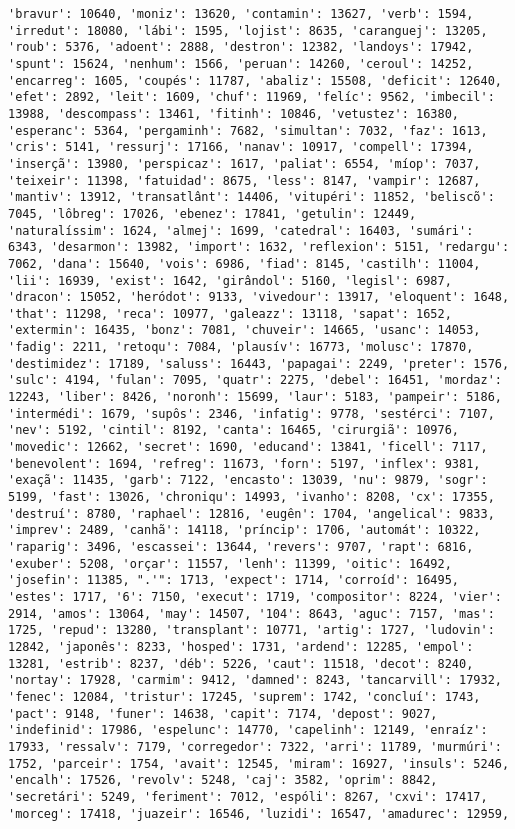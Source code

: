 \begin{Verbatim}[commandchars=\\\{\}]
'bravur': 10640, 'moniz': 13620, 'contamin': 13627, 'verb': 1594, 'irredut': 18080, 'lábi': 1595, 'lojist': 8635, 'caranguej': 13205, 'roub': 5376, 'adoent': 2888, 'destron': 12382, 'landoys': 17942, 'spunt': 15624, 'nenhum': 1566, 'peruan': 14260, 'ceroul': 14252, 'encarreg': 1605, 'coupés': 11787, 'abaliz': 15508, 'deficit': 12640, 'efet': 2892, 'leit': 1609, 'chuf': 11969, 'felíc': 9562, 'imbecil': 13988, 'descompass': 13461, 'fitinh': 10846, 'vetustez': 16380, 'esperanc': 5364, 'pergaminh': 7682, 'simultan': 7032, 'faz': 1613, 'cris': 5141, 'ressurj': 17166, 'nanav': 10917, 'compell': 17394, 'inserçã': 13980, 'perspicaz': 1617, 'paliat': 6554, 'míop': 7037, 'teixeir': 11398, 'fatuidad': 8675, 'less': 8147, 'vampir': 12687, 'mantiv': 13912, 'transatlânt': 14406, 'vitupéri': 11852, 'beliscõ': 7045, 'lôbreg': 17026, 'ebenez': 17841, 'getulin': 12449, 'naturalíssim': 1624, 'almej': 1699, 'catedral': 16403, 'sumári': 6343, 'desarmon': 13982, 'import': 1632, 'reflexion': 5151, 'redargu': 7062, 'dana': 15640, 'vois': 6986, 'fiad': 8145, 'castilh': 11004, 'lii': 16939, 'exist': 1642, 'girândol': 5160, 'legisl': 6987, 'dracon': 15052, 'heródot': 9133, 'vivedour': 13917, 'eloquent': 1648, 'that': 11298, 'reca': 10977, 'galeazz': 13118, 'sapat': 1652, 'extermin': 16435, 'bonz': 7081, 'chuveir': 14665, 'usanc': 14053, 'fadig': 2211, 'retoqu': 7084, 'plausív': 16773, 'molusc': 17870, 'destimidez': 17189, 'saluss': 16443, 'papagai': 2249, 'preter': 1576, 'sulc': 4194, 'fulan': 7095, 'quatr': 2275, 'debel': 16451, 'mordaz': 12243, 'liber': 8426, 'noronh': 15699, 'laur': 5183, 'pampeir': 5186, 'intermédi': 1679, 'supôs': 2346, 'infatig': 9778, 'sestérci': 7107, 'nev': 5192, 'cintil': 8192, 'canta': 16465, 'cirurgiã': 10976, 'movedic': 12662, 'secret': 1690, 'educand': 13841, 'ficell': 7117, 'benevolent': 1694, 'refreg': 11673, 'forn': 5197, 'inflex': 9381, 'exaçã': 11435, 'garb': 7122, 'encasto': 13039, 'nu': 9879, 'sogr': 5199, 'fast': 13026, 'chroniqu': 14993, 'ivanho': 8208, 'cx': 17355, 'destruí': 8780, 'raphael': 12816, 'eugên': 1704, 'angelical': 9833, 'imprev': 2489, 'canhã': 14118, 'príncip': 1706, 'automát': 10322, 'raparig': 3496, 'escassei': 13644, 'revers': 9707, 'rapt': 6816, 'exuber': 5208, 'orçar': 11557, 'lenh': 11399, 'oitic': 16492, 'josefin': 11385, ".'": 1713, 'expect': 1714, 'corroíd': 16495, 'estes': 1717, '6': 7150, 'execut': 1719, 'compositor': 8224, 'vier': 2914, 'amos': 13064, 'may': 14507, '104': 8643, 'aguc': 7157, 'mas': 1725, 'repud': 13280, 'transplant': 10771, 'artig': 1727, 'ludovin': 12842, 'japonês': 8233, 'hosped': 1731, 'ardend': 12285, 'empol': 13281, 'estrib': 8237, 'déb': 5226, 'caut': 11518, 'decot': 8240, 'nortay': 17928, 'carmim': 9412, 'damned': 8243, 'tancarvill': 17932, 'fenec': 12084, 'tristur': 17245, 'suprem': 1742, 'concluí': 1743, 'pact': 9148, 'funer': 14638, 'capit': 7174, 'depost': 9027, 'indefinid': 17986, 'espelunc': 14770, 'capelinh': 12149, 'enraíz': 17933, 'ressalv': 7179, 'corregedor': 7322, 'arri': 11789, 'murmúri': 1752, 'parceir': 1754, 'avait': 12545, 'miram': 16927, 'insuls': 5246, 'encalh': 17526, 'revolv': 5248, 'caj': 3582, 'oprim': 8842, 'secretári': 5249, 'feriment': 7012, 'espóli': 8267, 'cxvi': 17417, 'morceg': 17418, 'juazeir': 16546, 'luzidi': 16547, 'amadurec': 12959, 
\end{Verbatim}
